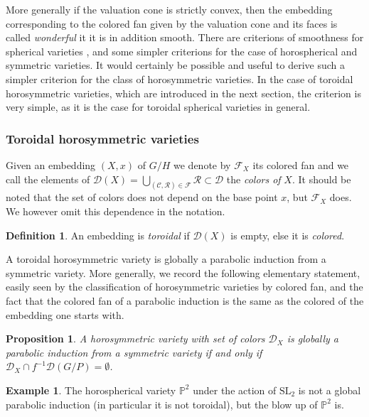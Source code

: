 \documentclass{amsart}
\newtheorem{prop}[thm]{Proposition}
\theoremstyle{definition}
\newtheorem{defn}[thm]{Definition}
\newtheorem{exa}[thm]{Example}
\begin{document}
More generally if the valuation cone is strictly convex, then the embedding 
corresponding to the colored fan given by the valuation cone and its faces 
is called \emph{wonderful} it it is in addition smooth.
There are criterions of smoothness for spherical varieties \cite{Bri91}, and 
some simpler criterions for the case of horospherical \cite{Pas08}
and symmetric \cite[Section 3]{Ruz11} varieties. It would certainly be possible and 
useful to derive such a simpler criterion for the class of horosymmetric 
varieties. 
In the case of toroidal horosymmetric varieties, which are introduced in the 
next section, the criterion is very simple, as it is the case for toroidal 
spherical varieties in general. 

\subsubsection{Toroidal horosymmetric varieties}

Given an embedding $(X,x)$ of $G/H$ we denote by $\mathcal{F}_X$ its 
colored fan and we call the elements of $\mathcal{D}(X)= 
\bigcup_{(\mathcal{C},\mathcal{R})\in \mathcal{F}}\mathcal{R}
\subset \mathcal{D}$
the \emph{colors of} $X$. 
It should be noted that the set of colors does not depend on the base 
point $x$, but $\mathcal{F}_X$ does. We however omit this dependence in the
notation.

\begin{defn}
An embedding is \emph{toroidal} if $\mathcal{D}(X)$ is empty, else 
it is \emph{colored}.
\end{defn}

A toroidal horosymmetric variety is globally a parabolic induction from 
a symmetric variety. More generally, we record the following elementary 
statement, easily seen by the classification of 
horosymmetric varieties by colored fan, and the fact that the colored 
fan of a parabolic induction is the same as the colored of the 
embedding one starts with. 

\begin{prop}
\label{prop_criterion_parabolic_induction}
A horosymmetric variety with set of colors $\mathcal{D}_X$ is globally 
a parabolic induction from a symmetric variety if and 
only if $\mathcal{D}_X\cap f^{-1}\mathcal{D}(G/P)=\emptyset$.
\end{prop}

\begin{exa}
The horospherical variety $\mathbb{P}^2$ under the action of $\mathrm{SL}_2$ is 
not a global parabolic induction (in particular it is not toroidal), 
but the blow up of $\mathbb{P}^2$ is. 
\end{exa}
\end{document}
